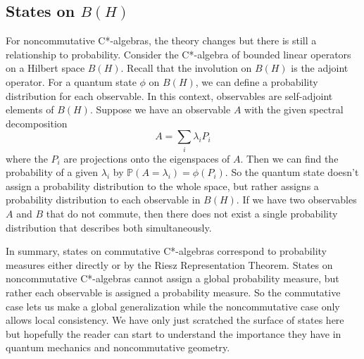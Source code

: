 \subsection{States on $B(H)$}
For noncommutative C*-algebras, the theory changes but there is still a relationship
to probability. Consider the C*-algebra of bounded linear operators on a Hilbert
space $B(H)$. Recall that  the involution on $B(H)$ is the adjoint operator. For a
quantum state $\phi$ on $B(H)$, we can define a probability distribution for each
observable. In this context, observables are self-adjoint elements of $B(H)$.
Suppose we have an observable $A$ with the given spectral decomposition
\begin{equation}
    A = \sum_i \lambda_i P_i
\end{equation}
where the $P_i$ are projections onto the eigenspaces of $A$. Then we can find the 
probability of a given $\lambda_i$ by $\mathbb{P}(A=\lambda_i) = \phi(P_i)$. So the
quantum state doesn't assign a probability distribution to the whole space, but rather
assigns a probability distribution to each observable in $B(H)$. If we have two
observables $A$ and $B$ that do not commute, then there does not exist a single 
probability distribution that describes both simultaneously.

\par 

In summary, states on commutative C*-algebras correspond to probability measures
either directly or by the Riesz Representation Theorem. States on noncommutative
C*-algebras cannot assign a global probability measure, but rather each observable
is assigned a probability measure. So the commutative case lets us make a global
generalization while the noncommutative case only allows local consistency. We have
only just scratched the surface of states here but hopefully the reader can start
to understand the importance they have in quantum mechanics and noncommutative geometry.


